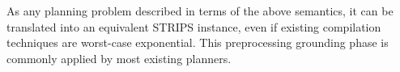 %
As any planning problem described in terms of the above semantics, it can be translated into an equivalent STRIPS instance,
even if existing compilation techniques are worst-case exponential.
This preprocessing grounding phase is commonly applied by 
 most existing planners. %
%
% 


